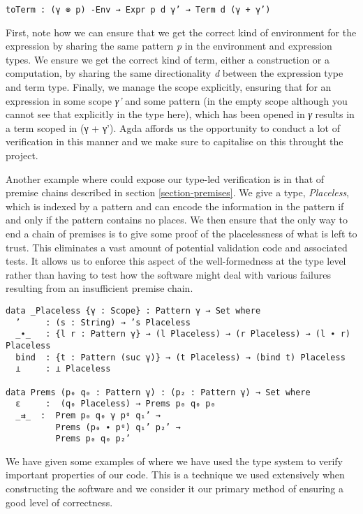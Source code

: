 \begin{verbatim}
toTerm : (γ ⊗ p) -Env → Expr p d γ’ → Term d (γ + γ’)
\end{verbatim}

First, note how we can ensure that we get the correct kind of
environment for the expression by sharing the same pattern \emph{p} in
the environment and expression types. We ensure we get the correct
kind of term, either a construction or a computation, by sharing the
same directionality \emph{d} between the expression type and term
type. Finally, we manage the scope explicitly, ensuring that for an
expression in some scope \emph{γ'} and some pattern (in the empty
scope although you cannot see that explicitly in the type here), which
has been opened in \emph{γ} results in a term scoped in (γ + γ'). Agda
affords us the opportunity to conduct a lot of verification in this
manner and we make sure to capitalise on this throught the project.

Another example where could expose our type-led verification is in
that of premise chains described in section \ref{section-premises}. We
give a type, \emph{Placeless}, which is indexed by a pattern and can
encode the information in the pattern if and only if the pattern
contains no places. We then ensure that the only way to end a chain of
premises is to give some proof of the placelessness of what is left to
trust. This eliminates a vast amount of potential validation code and
associated tests. It allows us to enforce this aspect of the
well-formedness at the type level rather than having to test how the
software might deal with various failures resulting from an insufficient
premise chain.

\begin{verbatim}
data _Placeless {γ : Scope} : Pattern γ → Set where
  ’     : (s : String) → ’s Placeless
  _∙_   : {l r : Pattern γ} → (l Placeless) → (r Placeless) → (l ∙ r) Placeless
  bind  : {t : Pattern (suc γ)} → (t Placeless) → (bind t) Placeless
  ⊥     : ⊥ Placeless

data Prems (p₀ q₀ : Pattern γ) : (p₂ : Pattern γ) → Set where
  ε     :  (q₀ Placeless) → Prems p₀ q₀ p₀
  _⇉_  :  Prem p₀ q₀ γ pᵍ q₁’ →
          Prems (p₀ ∙ pᵍ) q₁’ p₂’ →
          Prems p₀ q₀ p₂’
\end{verbatim}

We have given some examples of where we have used the type system to
verify important properties of our code. This is a technique we
used extensively when constructing the software and we consider it our
primary method of ensuring a good level of correctness.


